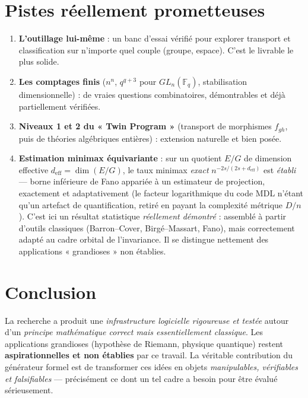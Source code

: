 \documentclass[11pt,a4paper]{article}
\theoremstyle{definition}
\begin{document}
\section{Pistes réellement prometteuses}

\begin{enumerate}
  \item \textbf{L'outillage lui-même} : un banc d'essai vérifié pour explorer
        transport et classification sur n'importe quel couple (groupe, espace).
        C'est le livrable le plus solide.
  \item \textbf{Les comptages finis} ($n^n$, $q^{q+3}$ pour $GL_n(\mathbb{F}_q)$,
        stabilisation dimensionnelle) : de vraies questions combinatoires,
        démontrables et déjà partiellement vérifiées.
  \item \textbf{Niveaux 1 et 2 du « Twin Program »} (transport de morphismes
        $f_{gh}$, puis de théories algébriques entières) : extension naturelle
        et bien posée.
  \item \textbf{Estimation minimax équivariante} : sur un quotient $E/G$ de
        dimension effective $d_{\mathrm{eff}}=\dim(E/G)$, le taux minimax
        \emph{exact} $n^{-2s/(2s+d_{\mathrm{eff}})}$ est \emph{établi} --- borne
        inférieure de Fano appariée à un estimateur de projection, exactement et
        adaptativement (le facteur logarithmique du code MDL n'étant qu'un
        artefact de quantification, retiré en payant la complexité métrique
        $D/n$). C'est ici un résultat statistique \emph{réellement démontré} :
        assemblé à partir d'outils classiques (Barron--Cover, Birgé--Massart,
        Fano), mais correctement adapté au cadre orbital de l'invariance. Il se
        distingue nettement des applications « grandioses » non établies.
\end{enumerate}

\section{Conclusion}

La recherche a produit une \emph{infrastructure logicielle rigoureuse et testée}
autour d'un \emph{principe mathématique correct mais essentiellement classique}.
Les applications grandioses (hypothèse de Riemann, physique quantique) restent
\textbf{aspirationnelles et non établies} par ce travail. La véritable
contribution du générateur formel est de transformer ces idées en objets
\emph{manipulables, vérifiables et falsifiables} --- précisément ce dont un tel
cadre a besoin pour être évalué sérieusement.
\end{document}
